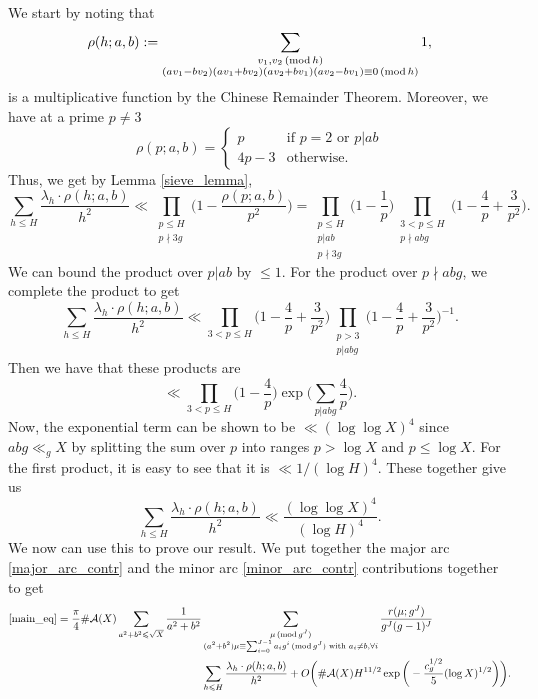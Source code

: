\documentclass[12pt]{amsart}
\theoremstyle{definition}
\theoremstyle{definition}
\theoremstyle{remark}
\numberwithin{equation}{section}
\newcommand{\CA}{\mathcal{A}}
\renewcommand{\leq}{\leqslant}
\renewcommand{\mod}[1]{\,({\rm mod}\,#1)}
\begin{document}
We start by noting that
$$ \rho(h; a,b) := \sum_{\substack{v_1,v_2 \mod h \\ (av_1 - bv_2)(av_1 + bv_2)(av_2 + b v_1)(av_2 - bv_1) \equiv 0 \mod h}} 1  ,$$
is a multiplicative function by the Chinese Remainder Theorem. Moreover, we have at a prime $p\not=3$
$$  \rho(p;a,b) = \begin{cases}
    p & \text{if } p=2 \text{ or } p|ab \\
    4p-3 & \text{otherwise}.
\end{cases}  $$
Thus, we get by Lemma \ref{sieve_lemma},
$$ \sum_{h\leq H} \frac{\lambda_h \cdot \rho(h;a,b)}{h^2} \ll \prod_{\substack{p\leq H \\ p\nmid 3g}} \bigg( 1 - \frac{\rho(p;a,b)}{p^2}\bigg) = \prod_{\substack{p\leq H \\ p|ab \\ p\nmid 3g}} \bigg( 1 - \frac{1}{p} \bigg) \prod_{\substack{3<p\leq H \\ p\nmid abg}} \bigg( 1 - \frac{4}{p} + \frac{3}{p^2} \bigg) . $$
We can bound the product over $p|ab$ by $\leq 1$. For the product over $p\nmid abg$, we complete the product to get
$$ \sum_{h\leq H} \frac{\lambda_h \cdot \rho(h;a,b)}{h^2} \ll \prod_{3<p\leq H} \bigg( 1 - \frac{4}{p} + \frac{3}{p^2} \bigg) \prod_{\substack{p>3 \\ p|abg}} \bigg( 1 - \frac{4}{p} + \frac{3}{p^2} \bigg)^{-1} . $$
Then we have that these products are
$$ \ll \prod_{3<p\leq H} \bigg( 1 - \frac{4}{p} \bigg) \exp\bigg(\sum_{p|abg} \frac{4}{p} \bigg). $$
Now, the exponential term can be shown to be $\ll (\log\log X)^4$ since $abg\ll_g X$ by splitting the sum over $p$ into ranges $p>\log X$ and $p\leq \log X$. For the first product, it is easy to see that it is $\ll 1/(\log H)^4$. These together give us
\begin{equation}\label{sieve_upper_bound}
 \sum_{h\leq H} \frac{\lambda_h \cdot \rho(h;a,b)}{h^2} \ll \frac{(\log\log X)^4}{(\log H)^4} .
\end{equation}
We now can use this to prove our result. We put together the major arc \eqref{major_arc_contr} and the minor arc \eqref{minor_arc_contr} contributions together to get
\begin{align*}
 \eqref{main_eq} = \frac{\pi}{4} \#\CA(X) \sum_{a^2+b^2 \leq \sqrt{X}} \frac{1}{a^2+b^2} &\sum_{\substack{\mu \mod{g^J} \\ (a^2+b^2)\mu \equiv \sum_{i=0}^{J-1}a_ig^i \mod{g^J} \text{ with } a_i\not=b, \forall i}} \frac{r(\mu ; g^J)}{g^J(g-1)^J} \\
&\sum_{h\leq H} \frac{\lambda_h \cdot \rho(h;a,b)}{h^2}  + O\bigg( \#\CA(X) H^{11/2}\exp\bigg( - \frac{c_g^{1/2}}{5} (\log X)^{1/2}  \bigg) \bigg).
\end{align*}
\end{document}
